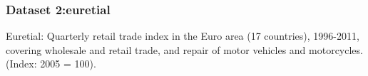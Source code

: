 \subsubsection{Dataset 2:euretial}
Euretial: Quarterly retail trade index in the Euro area (17 countries), 1996-2011, covering wholesale and retail trade, and repair of motor vehicles and motorcycles. (Index: 2005 = 100).